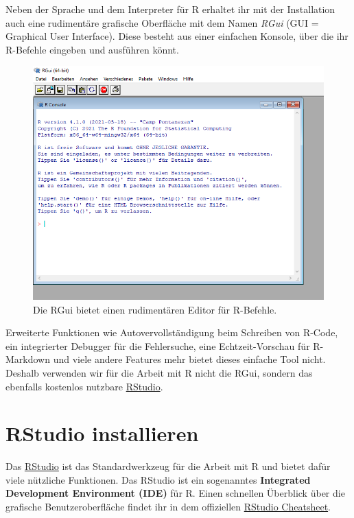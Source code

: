 \documentclass[
]{book}
\begin{document}
Neben der Sprache und dem Interpreter für R erhaltet ihr mit der Installation auch eine rudimentäre grafische Oberfläche mit dem Namen \emph{RGui} (GUI = Graphical User Interface). Diese besteht aus einer einfachen Konsole, über die ihr R-Befehle eingeben und ausführen könnt.

\begin{figure}
\includegraphics[width=1\linewidth]{fig/screenshot_r_console} \caption{Die RGui bietet einen rudimentären Editor für R-Befehle.}\label{fig:screenshot-r-console}
\end{figure}

Erweiterte Funktionen wie Autovervollständigung beim Schreiben von R-Code, ein integrierter Debugger für die Fehlersuche, eine Echtzeit-Vorschau für R-Markdown und viele andere Features mehr bietet dieses einfache Tool nicht. Deshalb verwenden wir für die Arbeit mit R nicht die RGui, sondern das ebenfalls kostenlos nutzbare \href{https://www.rstudio.com/products/rstudio/}{RStudio}.

\hypertarget{rstudio-installieren}{%
\section{RStudio installieren}\label{rstudio-installieren}}

Das \href{https://www.rstudio.com/}{RStudio} ist das Standardwerkzeug für die Arbeit mit R und bietet dafür viele nützliche Funktionen. Das RStudio ist ein sogenanntes \textbf{Integrated Development Environment (IDE)} für R. Einen schnellen Überblick über die grafische Benutzeroberfläche findet ihr in dem offiziellen \href{https://raw.githubusercontent.com/rstudio/cheatsheets/main/rstudio-ide.pdf}{RStudio Cheatsheet}.
\end{document}
